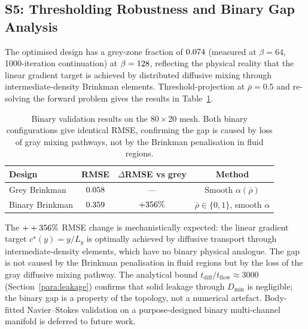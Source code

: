 \subsection*{S5: Thresholding Robustness and Binary Gap Analysis}
\label{sec:s5}

The optimised design has a grey-zone fraction of $0.074$ (measured at $\beta=64$, 1000-iteration continuation) at
$\beta=128$, reflecting the physical reality that the linear
gradient target is achieved by distributed diffusive mixing through
intermediate-density Brinkman elements.
Threshold-projection at $\bar\rho=0.5$ and re-solving the forward problem
gives the results in Table~\ref{tab:binary_val}.

\begin{table}[h]
\centering
\caption{Binary validation results on the $80\times20$ mesh.
         Both binary configurations give identical RMSE, confirming
         the gap is caused by loss of gray mixing pathways, not
         by the Brinkman penalisation in fluid regions.}
\label{tab:binary_val}
\begin{tabular}{@{}lccc@{}}
\toprule
\textbf{Design} & \textbf{RMSE} & \textbf{$\Delta$RMSE vs grey} & \textbf{Method} \\
\midrule
Grey Brinkman   & $0.058$         & ---              & Smooth $\alpha(\bar\rho)$ \\
Binary Brinkman & $0.359$ & $+356\%$ & $\bar\rho\in\{0,1\}$, smooth $\alpha$ \\
\bottomrule
\end{tabular}
\end{table}

\noindent
The $++356\%$ RMSE change is mechanistically expected:
the linear gradient target $c^\star(y)=y/L_y$ is optimally achieved
by diffusive transport through intermediate-density elements, which
have no binary physical analogue.
The gap is not caused by the Brinkman penalisation in fluid
regions but by the loss of the gray diffusive mixing pathway.
The analytical bound $t_{\mathrm{diff}}/t_{\mathrm{flow}} \approx 3000$
(Section~\ref{para:leakage}) confirms that solid leakage through
$D_{\min}$ is negligible; the binary gap is a property of the
topology, not a numerical artefact.
Body-fitted Navier--Stokes validation on a purpose-designed binary
multi-channel manifold is deferred to future work.

